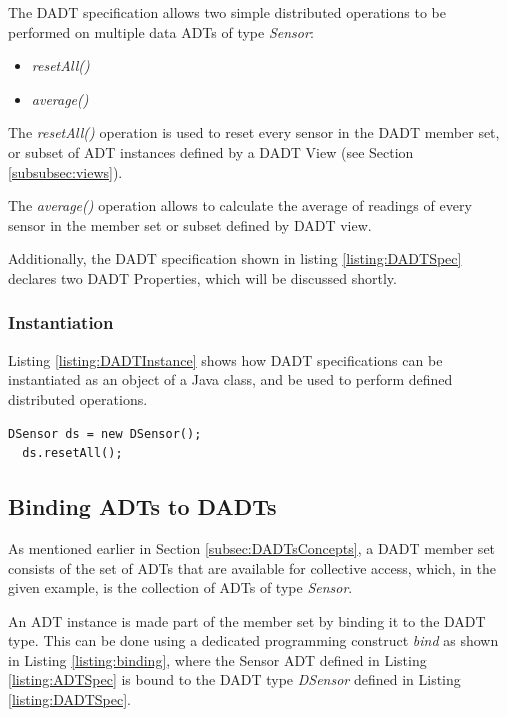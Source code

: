 The DADT specification allows two simple distributed operations to be performed
on multiple data ADTs of type \emph{Sensor}:  
\begin{itemize}
\item \emph{resetAll()} 
\item \emph{average()} 
\end{itemize}

The \emph{resetAll()} operation is used to reset every sensor in the DADT member
set, or subset of ADT instances defined by a DADT View (see Section
\ref{subsubsec:views}).

The \emph{average()} operation allows to calculate the average of readings of every
sensor in the member set or subset defined by DADT view.

Additionally, the DADT specification  shown in listing \ref{listing:DADTSpec}
declares two DADT Properties, which will be discussed shortly.

\subsubsection{Instantiation}

Listing \ref{listing:DADTInstance} shows how DADT specifications can be
instantiated as an object of a Java class, and be used to perform defined
distributed operations.

\begin{lstlisting}[frame=trbl, basewidth={0.55em, 0.6em}, captionpos=b, 
basicstyle=\ttfamily\footnotesize, breaklines, caption = DADT Instantiation 
(reproduced from \cite{migliavacca_DADT:2006}), label = listing:DADTInstance ]
  DSensor ds = new DSensor();
  ds.resetAll();
\end{lstlisting}

\subsection{Binding ADTs to DADTs}

As mentioned earlier in Section \ref{subsec:DADTsConcepts}, a DADT member set
consists of the set of ADTs that are available for collective
access, which, in the given example, is the collection of ADTs of type \emph{Sensor}.

An ADT instance is made part of the member set by binding it to the DADT type.
This can be done using a dedicated programming construct \emph{bind} as shown in
Listing \ref{listing:binding}, where the Sensor ADT defined in Listing
\ref{listing:ADTSpec} is bound to the DADT type \emph{DSensor} defined in Listing \ref{listing:DADTSpec}.
 
